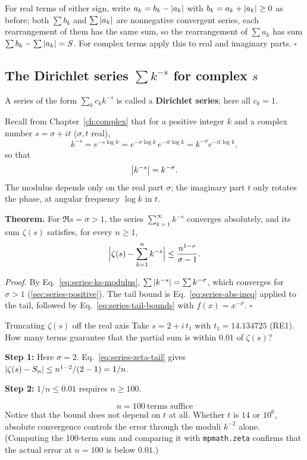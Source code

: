 For real terms of either sign, write $a_k=b_k-\left\lvert a_k\right\rvert$ with $b_k=a_k+\left\lvert a_k\right\rvert\ge0$ as before; both $\sum b_k$ and $\sum\left\lvert a_k\right\rvert$ are nonnegative convergent series, each rearrangement of them has the same sum, so the rearrangement of $\sum a_k$ has sum $\sum b_k-\sum\left\lvert a_k\right\rvert=S$. For complex terms apply this to real and imaginary parts. $\square$

\subsection{The Dirichlet series $\sum k^{-s}$ for complex $s$}

A series of the form $\sum_kc_kk^{-s}$ is called a \textbf{Dirichlet series}; here all $c_k=1$.


Recall from Chapter~\ref{ch:complex} that for a positive integer $k$ and a complex number $s=\sigma+it$ ($\sigma,t$ real),
\[
k^{-s}=e^{-s\log k}=e^{-\sigma\log k}\,e^{-it\log k}=k^{-\sigma}e^{-it\log k},
\]
so that
\begin{equation}
\left\lvert k^{-s}\right\rvert=k^{-\sigma}.
\label{eq:series-ks-modulus}
\end{equation}
The modulus depends only on the real part $\sigma$; the imaginary part $t$ only rotates the phase, at angular frequency $\log k$ in $t$.

\textbf{Theorem.} For $\Re s=\sigma>1$, the series $\sum_{k=1}^\infty k^{-s}$ converges absolutely, and its sum $\zeta(s)$ satisfies, for every $n\ge1$,
\begin{equation}
\Bigl|\zeta(s)-\sum_{k=1}^nk^{-s}\Bigr|\le\frac{n^{1-\sigma}}{\sigma-1}.
\label{eq:series-zeta-tail}
\end{equation}

\emph{Proof.} By Eq.~\eqref{eq:series-ks-modulus}, $\sum\left\lvert k^{-s}\right\rvert=\sum k^{-\sigma}$, which converges for $\sigma>1$ (\cref{sec:series-positive}). The tail bound is Eq.~\eqref{eq:series-abs-ineq} applied to the tail, followed by Eq.~\eqref{eq:series-tail-bounds} with $f(x)=x^{-\sigma}$. $\square$

\begin{sample}{Truncating $\zeta(s)$ off the real axis}
Take $s=2+i\,t_1$ with $t_1=14.134725$ (RE1). How many terms guarantee that the partial sum is within $0.01$ of $\zeta(s)$?

\textbf{Step 1:} Here $\sigma=2$. Eq.~\eqref{eq:series-zeta-tail} gives $\left\lvert \zeta(s)-S_n\right\rvert\le n^{1-2}/(2-1)=1/n$.

\textbf{Step 2:} $1/n\le0.01$ requires $n\ge100$.

\[\boxed{n=100\ \text{terms suffice}}\]
Notice that the bound does not depend on $t$ at all. Whether $t$ is $14$ or $10^6$, absolute convergence controls the error through the moduli $k^{-2}$ alone. (Computing the 100-term sum and comparing it with \texttt{mpmath.zeta} confirms that the actual error at $n=100$ is below $0.01$.)
\end{sample}

